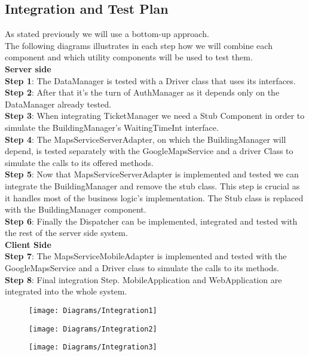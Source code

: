 \subsection{Integration and Test Plan}

As stated previously we will use a bottom-up approach.\\
The following diagrams illustrates in each step how we will combine each component and which utility components will be used to test them.\\
\newline
\textbf{Server side}\\
\textbf{Step 1}:
The DataManager is tested with a Driver class that uses its interfaces.\\
\textbf{Step 2}:
After that it's the turn of AuthManager as it depends only on the DataManager already tested.\\
\textbf{Step 3}:
When integrating TicketManager we need a Stub Component in order to simulate the BuildingManager's WaitingTimeInt interface.\\
\textbf{Step 4}:
The MapsServiceServerAdapter, on which the BuildingManager will depend, is tested separately with the GoogleMapsService and a driver Class to simulate the calls to its offered methods.\\
\textbf{Step 5}:
Now that MapsServiceServerAdapter is implemented and tested we can integrate the BuildingManager and remove the stub class. This step is crucial as it handles most of the business logic's implementation. The Stub class is replaced with the BuildingManager component.\\
\textbf{Step 6}: Finally the Dispatcher can be implemented, integrated and tested with the rest of the server side system.\\
\newline
\textbf{Client Side}\\
\textbf{Step 7}: The MapsServiceMobileAdapter is implemented and tested with the GoogleMapsService and a Driver class to simulate the calls to its methods.\\
\textbf{Step 8}:
Final integration Step. MobileApplication and WebApplication are integrated into the whole system.
 
  \begin{figure}[H]
 \centering
 \texttt{[image: Diagrams/Integration1]}
 \end{figure}
 
 \newpage
 
  \begin{figure}[H]
 \centering
 \texttt{[image: Diagrams/Integration2]}
 \end{figure}
 
   \begin{figure}[H]
 \centering
 \texttt{[image: Diagrams/Integration3]}
 \end{figure}
